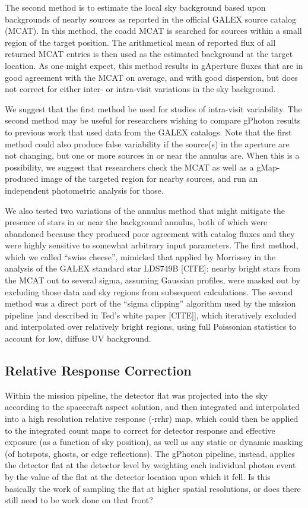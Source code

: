\documentclass[5p]{elsarticle}
\begin{document}
The second method is to estimate the local sky background based upon backgrounds of nearby sources as reported in the official GALEX source catalog (MCAT). In this method, the coadd MCAT is searched for sources within a small region of the target position. The arithmetical mean of reported flux of all returned MCAT entries is then used as the estimated background at the target location. As one might expect, this method results in gAperture fluxes that are in good agreement with the MCAT on average, and with good dispersion, but does not correct for either inter- or intra-visit variations in the sky background.

We suggest that the first method be used for studies of intra-visit variability. The second method may be useful for researchers wishing to compare gPhoton results to previous work that used data from the GALEX catalogs. Note that the first method could also produce false variability if the source(s) in the aperture are not changing, but one or more sources in or near the annulus are.  When this is a possibility, we suggest that researchers check the MCAT as well as a gMap-produced image of the targeted region for nearby sources, and run an independent photometric analysis for those.

We also tested two variations of the annulus method that might mitigate the presence of stars in or near the background annulus, both of which were abandoned because they produced poor agreement with catalog fluxes and they were highly sensitive to somewhat arbitrary input parameters. The first method, which we called ``swiss cheese'', mimicked that applied by {\color{red}Morrissey in the analysis of the GALEX standard star LDS749B [CITE]}: nearby bright stars from the MCAT out to several sigma, assuming Gaussian profiles, were masked out by excluding those data and sky regions from subsequent calculations. The second method was a direct port of the ``sigma clipping'' algorithm used by the mission pipeline {\color{red}[and described in Ted's white paper [CITE]]}, which iteratively excluded and interpolated over relatively bright regions, using full Poissonian statistics to account for low, diffuse UV background.

\subsection{Relative Response Correction}
Within the mission pipeline, the detector flat was projected into the sky according to the spacecraft aspect solution, and then integrated and interpolated into a high resolution relative response (-rrhr) map, which could then be applied to the integrated count maps to correct for detector response and effective exposure (as a function of sky position), as well as any static or dynamic masking (of hotspots, ghosts, or edge reflections). The gPhoton pipeline, instead, applies the detector flat at the detector level by weighting each individual photon event by the value of the flat at the detector location upon which it fell.  {\color{red}Is this basically the work of sampling the flat at higher spatial resolutions, or does there still need to be work done on that front?}
\end{document}
